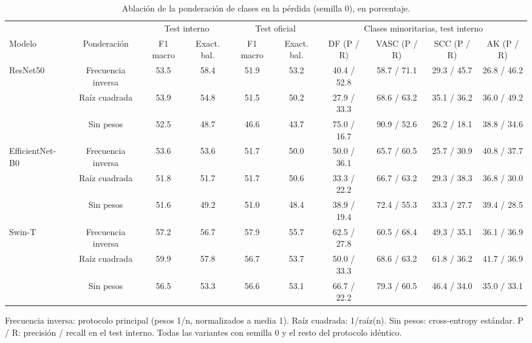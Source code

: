 \begin{table}[t]
\centering
\caption{Ablación de la ponderación de clases en la pérdida (semilla 0), en porcentaje.}
\label{tab:tabla6_ablacion_pesos}
\footnotesize
\setlength{\tabcolsep}{3pt}
\begin{tabular}{lccccccccc}
\toprule
 &  & \multicolumn{2}{c}{Test interno} & \multicolumn{2}{c}{Test oficial} & \multicolumn{4}{c}{Clases minoritarias, test interno} \\
\cmidrule(lr){3-4} \cmidrule(lr){5-6} \cmidrule(lr){7-10}
Modelo & Ponderación & F1 macro & Exact. bal. & F1 macro  & Exact. bal.  & DF (P / R) & VASC (P / R) & SCC (P / R) & AK (P / R) \\
\midrule
ResNet50 & Frecuencia inversa & 53.5 & 58.4 & 51.9 & 53.2 & 40.4 / 52.8 & 58.7 / 71.1 & 29.3 / 45.7 & 26.8 / 46.2 \\
 & Raíz cuadrada & 53.9 & 54.8 & 51.5 & 50.2 & 27.9 / 33.3 & 68.6 / 63.2 & 35.1 / 36.2 & 36.0 / 49.2 \\
 & Sin pesos & 52.5 & 48.7 & 46.6 & 43.7 & 75.0 / 16.7 & 90.9 / 52.6 & 26.2 / 18.1 & 38.8 / 34.6 \\
EfficientNet-B0 & Frecuencia inversa & 53.6 & 53.6 & 51.7 & 50.0 & 50.0 / 36.1 & 65.7 / 60.5 & 25.7 / 30.9 & 40.8 / 37.7 \\
 & Raíz cuadrada & 51.8 & 51.7 & 51.7 & 50.6 & 33.3 / 22.2 & 66.7 / 63.2 & 29.3 / 38.3 & 36.8 / 30.0 \\
 & Sin pesos & 51.6 & 49.2 & 51.0 & 48.4 & 38.9 / 19.4 & 72.4 / 55.3 & 33.3 / 27.7 & 39.4 / 28.5 \\
Swin-T & Frecuencia inversa & 57.2 & 56.7 & 57.9 & 55.7 & 62.5 / 27.8 & 60.5 / 68.4 & 49.3 / 35.1 & 36.1 / 36.9 \\
 & Raíz cuadrada & 59.9 & 57.8 & 56.7 & 53.7 & 50.0 / 33.3 & 68.6 / 63.2 & 61.8 / 36.2 & 41.7 / 36.9 \\
 & Sin pesos & 56.5 & 53.3 & 56.6 & 53.1 & 66.7 / 22.2 & 79.3 / 60.5 & 46.4 / 34.0 & 35.0 / 33.1 \\
\bottomrule
\end{tabular}
\par\vspace{2pt}
\parbox{\linewidth}{\scriptsize Frecuencia inversa: protocolo principal (pesos 1/n, normalizados a media 1). Raíz cuadrada: 1/raíz(n). Sin pesos: cross-entropy estándar. P / R: precisión / recall en el test interno. Todas las variantes con semilla 0 y el resto del protocolo idéntico.}
\end{table}
